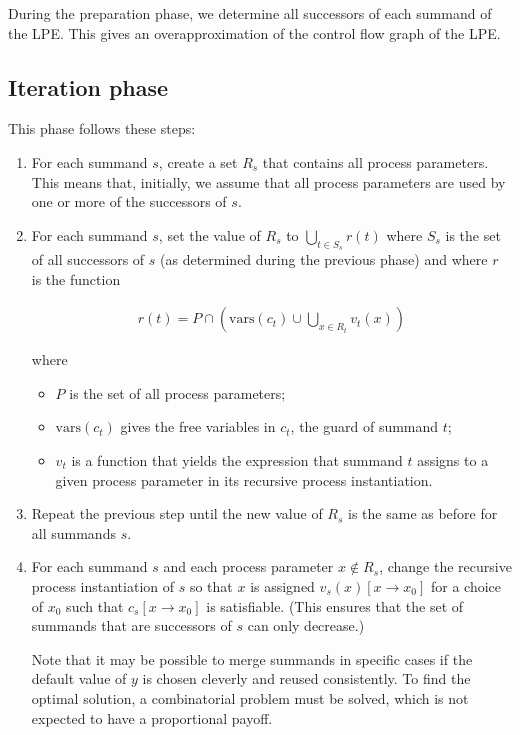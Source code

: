 During the preparation phase, we determine all successors of each summand of the LPE.
This gives an overapproximation of the control flow graph of the LPE.

\subsection{Iteration phase}

This phase follows these steps:

\begin{enumerate}

\item For each summand $s$, create a set $R_s$ that contains all process parameters.
This means that, initially, we assume that all process parameters are used by one or more of the successors of $s$.

\item For each summand $s$, set the value of $R_s$ to $\bigcup\limits_{t \in S_s}^{} r(t)$ where $S_s$ is the set of all successors of $s$ (as determined during the previous phase) and where $r$ is the function

\begin{align*}
r(t) = P \cap \left( \text{vars}(c_t) \cup \bigcup\limits_{x \in R_t}^{} v_t(x) \right)
\end{align*}

where

\begin{itemize}
\item $P$ is the set of all process parameters;
\item $\text{vars}(c_t)$ gives the free variables in $c_t$, the guard of summand $t$;
\item $v_t$ is a function that yields the expression that summand $t$ assigns to a given process parameter in its recursive process instantiation.
\end{itemize}

\item Repeat the previous step until the new value of $R_s$ is the same as before for all summands $s$.

\item For each summand $s$ and each process parameter $x \notin R_s$, change the recursive process instantiation of $s$ so that $x$ is assigned ${v_s}(x)[x \rightarrow x_0]$ for a choice of $x_0$ such that ${c_s}[x \rightarrow x_0]$ is satisfiable.
(This ensures that the set of summands that are successors of $s$ can only decrease.)

Note that it may be possible to merge summands in specific cases if the default value of $y$ is chosen cleverly and reused consistently.
To find the optimal solution, a combinatorial problem must be solved, which is not expected to have a proportional payoff.

\end{enumerate}

